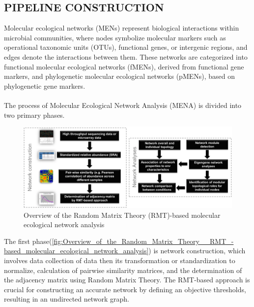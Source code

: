 \subsection{PIPELINE CONSTRUCTION}\label{subsec:pipeline-construction}

Molecular ecological networks (MENs) represent biological interactions within microbial communities, where nodes symbolize molecular markers such as operational taxonomic units (OTUs), functional genes, or intergenic regions, and edges denote the interactions between them.
These networks are categorized into functional molecular ecological networks (fMENs), derived from functional gene markers, and phylogenetic molecular ecological networks (pMENs), based on phylogenetic gene markers.
\\\\
\noindent The process of Molecular Ecological Network Analysis (MENA) is divided into two primary phases.

\begin{figure}[H]
    \centering
    \includegraphics[width=1\textwidth]{Overview_of_the_Random_Matrix_Theory__RMT_-based_molecular_ecological_network_analysis_horizontal} %
    \caption{Overview of the Random Matrix Theory (RMT)-based molecular ecological network analysis\cite{deng_molecular_2012}}
    \label{fig:Overview_of_the_Random_Matrix_Theory__RMT_-based_molecular_ecological_network_analysis}
\end{figure}

The first phase(\autoref{fig:Overview_of_the_Random_Matrix_Theory__RMT_-based_molecular_ecological_network_analysis}) is network construction, which involves data collection of data then its transformation or standardization to normalize, calculation of pairwise similarity matrices, and the determination of the adjacency matrix using Random Matrix Theory.
The RMT-based approach is crucial for constructing an accurate network by defining an objective thresholds, resulting in an undirected network graph.

